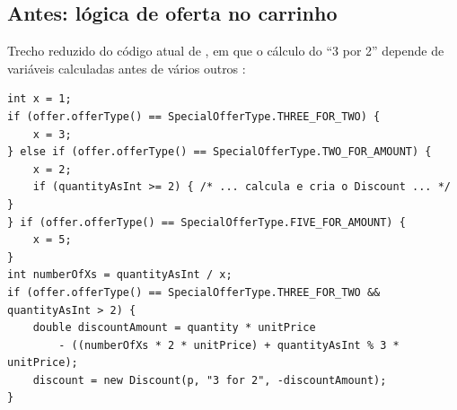 \subsection{Antes: l\'ogica de oferta no carrinho}
Trecho reduzido do c\'odigo atual de , em que o c\'alculo do ``3 por 2'' depende de vari\'aveis calculadas antes de v\'arios outros :
\begin{lstlisting}
int x = 1;
if (offer.offerType() == SpecialOfferType.THREE_FOR_TWO) {
    x = 3;
} else if (offer.offerType() == SpecialOfferType.TWO_FOR_AMOUNT) {
    x = 2;
    if (quantityAsInt >= 2) { /* ... calcula e cria o Discount ... */ }
} if (offer.offerType() == SpecialOfferType.FIVE_FOR_AMOUNT) {
    x = 5;
}
int numberOfXs = quantityAsInt / x;
if (offer.offerType() == SpecialOfferType.THREE_FOR_TWO && quantityAsInt > 2) {
    double discountAmount = quantity * unitPrice
        - ((numberOfXs * 2 * unitPrice) + quantityAsInt % 3 * unitPrice);
    discount = new Discount(p, "3 for 2", -discountAmount);
}
\end{lstlisting}

